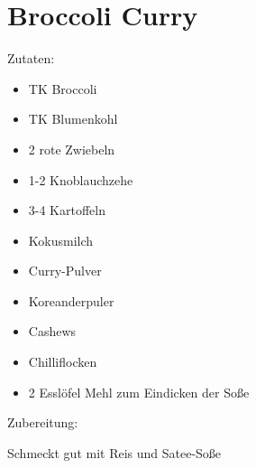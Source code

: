 \section{Broccoli Curry}

Zutaten:
\begin{itemize}
	\item TK Broccoli
	\item TK Blumenkohl
	\item 2 rote Zwiebeln
	\item 1-2 Knoblauchzehe
	\item 3-4 Kartoffeln
	\item Kokusmilch
	\item Curry-Pulver
	\item Koreanderpuler
	\item Cashews
	\item Chilliflocken
	\item 2 Esslöfel Mehl zum Eindicken der Soße
\end{itemize}

\noindent Zubereitung:

\noindent

Schmeckt gut mit Reis und Satee-Soße


\newpage
\mbox{}
\vfill
\begin{center}

\end{center}
\vfill
\mbox{ }
\newpage
